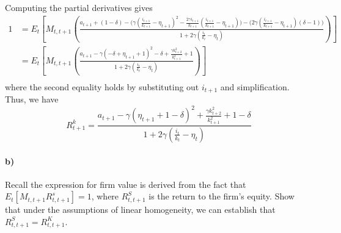 \documentclass[12pt,letter]{article}
\begin{document}
Computing the partial derivatives gives
\begin{equation*}
\begin{split}
1 &= E_t \left[M_{t, t+1}\left(\frac{a_{t+1} + (1-\delta) - \bigg(\gamma  \left(\frac{i_{t+1}}{k_{t+1}}-\eta_{t+1} \right)^2-\frac{2 \gamma  i_{t+1}}{k_{t+1}} \left(\frac{i_{t+1}}{k_{t+1}}-\eta_{t+1} \right)\bigg) - \bigg(2 \gamma  \left(\frac{i_{t+1}}{k_{t+1}}-\eta_{t+1} \right) (\delta-1)\bigg)}{1 + 2 \gamma  \left(\frac{i_t}{k_t}-\eta_t \right)}\right)\right]\\
&=E_t \left[M_{t, t+1}\left(\frac{a_{t+1}-\gamma  (-\delta +\eta_{t+1}+1)^2-\delta +\frac{\gamma k_{t+2}^2}{k_{t+1}^2}+1}{1 + 2 \gamma  \left(\frac{i_t}{k_t}-\eta_t \right)}\right)\right]\\
\end{split}
\end{equation*}
where the second equality holds by substituting out $i_{t+1}$ and simplification. Thus, we have 
\begin{equation*}
	R^k_{t+1} = \frac{a_{t+1}-\gamma  (\eta_{t+1}+1-\delta)^2 +\frac{\gamma k_{t+2}^2}{k_{t+1}^2}+1-\delta}{1 + 2 \gamma  \left(\frac{i_t}{k_t}-\eta_t \right)}
\end{equation*}
\paragraph{b)} Recall the expression for firm value is derived from the fact that $E_t\left[M_{t, t+1}R^s_{t, t+1}\right] = 1$, where $R^S_{t, t+1}$ is the return to the firm's equity. Show that under the assumptions of linear homogeneity, we can establish that $R^S_{t, t+1} = R^K_{t, t+1}$.\\
\end{document}
